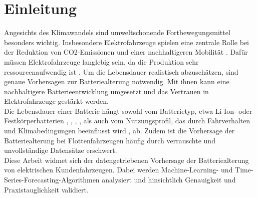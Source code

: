 
\chapter{Einleitung}
Angesichts des Klimawandels sind umweltschonende Fortbewegungsmittel besonders wichtig. Insbesondere Elektrofahrzeuge spielen eine zentrale Rolle bei der Reduktion von CO2-Emissionen und einer nachhaltigeren Mobilität \cite{urlIdParisKlimaabkommen}. Dafür müssen Elektrofahrzeuge langlebig sein, da die Produktion sehr ressourcenaufwendig ist \cite{urlIdUmwelteinflussLithiumBatterien}. Um die Lebensdauer realistisch abzuschätzen, sind genaue Vorhersagen zur Batteriealterung notwendig. Mit ihnen kann eine nachhaltigere Batterieentwicklung umgesetzt und das Vertrauen in Elektrofahrzeuge gestärkt werden.\\
Die Lebensdauer einer Batterie hängt sowohl vom Batterietyp, etwa Li-Ion- oder Festkörperbatterien \cite{urlIdBatterieAlterungLithiumBatterien}, \cite{urlIdBatterieAlterungVerschiedenerSoCLithiumBatterien}, \cite{urlIdBatterieAlterungFestkörperBatterien}, \cite{urlIdBatterieAlterungVerschiedenerSoCLithiumBatterien}, als auch vom Nutzungsprofil, das durch Fahrverhalten und Klimabedingungen beeinflusst wird \cite{urlIdBatterieAlterungTemperatur}, ab. Zudem ist die Vorhersage der Batteriealterung bei Flottenfahrzeugen häufig durch verrauschte und unvollständige Datensätze erschwert.\\
Diese Arbeit widmet sich der datengetriebenen Vorhersage der Batteriealterung von elektrischen Kundenfahrzeugen. Dabei werden Machine-Learning- und Time-Series-Forecasting-Algorithmen analysiert und hinsichtlich Genauigkeit und Praxistauglichkeit validiert.

\pagebreak
